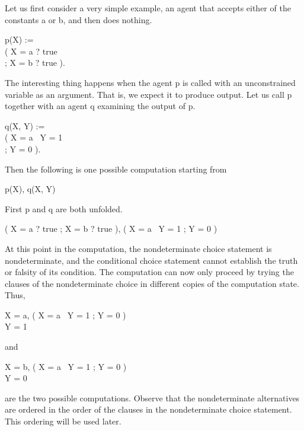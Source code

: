 Let us first consider a very simple example, an agent that accepts
either of the constants a or b, and then does nothing.
%
\begin{program}
p(X) := \\
\>\>( X = a ? true \\
\>\>; X = b ? true ).
\end{program}%
%
The interesting thing happens when the agent {\prog p} is called with
an unconstrained variable as an argument.  That is, we expect it to
produce output.  Let us call {\prog p} together with an agent {\prog
q} examining the output of {\prog p}.
%
\begin{program}
q(X, Y) := \\
\>\>( X = a \cond\ Y = 1 \\
\>\>; Y = 0 ).
\end{program}%
%
Then the following is one possible computation starting from
%
\begin{progex}
p(X), q(X, Y)
\end{progex}%
%
First p and q are both unfolded.
%
\begin{progex}
( X = a ? true ; X = b ? true ), ( X = a \cond\ Y = 1 ; Y = 0 )
\end{progex}%
%
At this point in the computation, the nondeterminate choice statement
is nondeterminate, and the conditional choice statement cannot
establish the truth or falsity of its condition.  The computation can
now only proceed by trying the clauses of the nondeterminate choice in
different copies of the computation state.  Thus,
%
\begin{progex}
X = a, ( X = a \cond\ Y = 1 ; Y = 0 ) \\
Y = 1
\end{progex}%
%
and
%
\begin{progex}
X = b, ( X = a \cond\ Y = 1 ; Y = 0 ) \\
Y = 0
\end{progex}%
%
are the two possible computations.  Observe that the nondeterminate
alternatives are ordered in the order of the clauses in the
nondeterminate choice statement.  This ordering will be used later.

